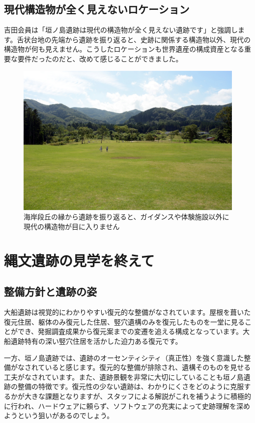 \documentclass[a4j,11pt,twocolumn,openany]{jsbook}
\begin{document}
\subsection{現代構造物が全く見えないロケーション}

吉田会員は「垣ノ島遺跡は現代の構造物が全く見えない遺跡です」と強調します。舌状台地の先端から遺跡を振り返ると、史跡に関係する構造物以外、現代の構造物が何も見えません。こうしたロケーションも世界遺産の構成資産となる重要な要件だったのだと、改めて感じることができました。

\begin{figure}[ht]
	\centering
	\includegraphics[width=\linewidth]{fig/01_Iseki_kengaku/18Kakinosima_zenkei02.JPG}
	\caption{海岸段丘の縁から遺跡を振り返ると、ガイダンスや体験施設以外に現代の構造物が目に入りません}
	\label{}
\end{figure}

\newpage
\section{縄文遺跡の見学を終えて}

\subsection{整備方針と遺跡の姿}
大船遺跡は視覚的にわかりやすい復元的な整備がなされています。屋根を葺いた復元住居、躯体のみ復元した住居、竪穴遺構のみを復元したものを一堂に見ることができ、発掘調査成果から復元案までの変遷を追える構成となっています。大船遺跡特有の深い竪穴住居を活かした迫力ある復元です。

一方、垣ノ島遺跡では、遺跡のオーセンティシティ（真正性）を強く意識した整備がなされていると感じます。復元的な整備が排除され、遺構そのものを見せる工夫がなされています。また、遺跡景観を非常に大切にしていることも垣ノ島遺跡の整備の特徴です。復元性の少ない遺跡は、わかりにくさをどのように克服するかが大きな課題となりますが、スタッフによる解説がこれを補うように積極的に行われ、ハードウェアに頼らず、ソフトウェアの充実によって史跡理解を深めようという狙いがあるのでしょう。
\end{document}
